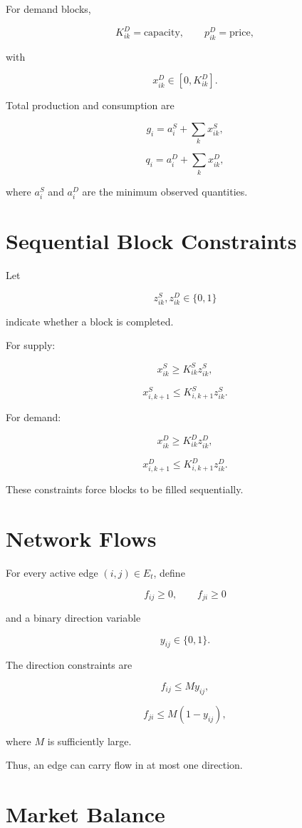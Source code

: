 \documentclass[11pt]{article}
\begin{document}
For demand blocks,

\[
K^D_{ik}=\text{capacity},\qquad
p^D_{ik}=\text{price},
\]

with

\[
x^D_{ik}\in[0,K^D_{ik}].
\]

Total production and consumption are

\[
g_i=a^S_i+\sum_k x^S_{ik},
\]

\[
q_i=a^D_i+\sum_k x^D_{ik},
\]

where $a^S_i$ and $a^D_i$ are the minimum observed quantities.

\section{Sequential Block Constraints}

Let

\[
z^S_{ik},z^D_{ik}\in\{0,1\}
\]

indicate whether a block is completed.

For supply:

\[
x^S_{ik}\ge K^S_{ik}z^S_{ik},
\]

\[
x^S_{i,k+1}\le K^S_{i,k+1}z^S_{ik}.
\]

For demand:

\[
x^D_{ik}\ge K^D_{ik}z^D_{ik},
\]

\[
x^D_{i,k+1}\le K^D_{i,k+1}z^D_{ik}.
\]

These constraints force blocks to be filled sequentially.

\section{Network Flows}

For every active edge $(i,j)\in E_t$, define

\[
f_{ij}\ge0,\qquad f_{ji}\ge0
\]

and a binary direction variable

\[
y_{ij}\in\{0,1\}.
\]

The direction constraints are

\[
f_{ij}\le My_{ij},
\]

\[
f_{ji}\le M(1-y_{ij}),
\]

where $M$ is sufficiently large.

Thus, an edge can carry flow in at most one direction.

\section{Market Balance}
\end{document}
